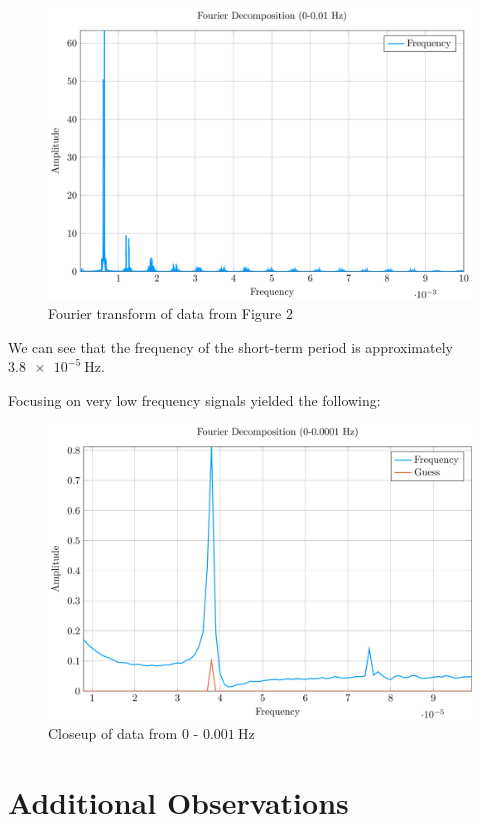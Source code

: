 \documentclass{article}
\begin{document}
\begin{multicols}{2}
  \begin{figure}[H]
    \includegraphics[scale=0.2]{fourier_high}
    \caption{Fourier transform of data from Figure 2}
  \end{figure}

  We can see that the frequency of the short-term period is approximately $\SI{3.8e-5}{\hertz}$.

  Focusing on very low frequency signals yielded the following:

  \begin{figure}[H]
    \includegraphics[scale=0.2]{fourier_low}
    \caption{Closeup of data from $0$ - $\SI{0.001}{\hertz}$}
  \end{figure}

  \section{Additional Observations}


\end{multicols}
\end{document}
